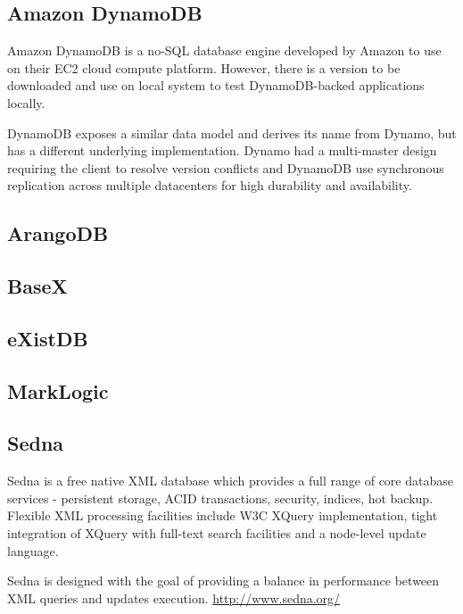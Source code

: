 \subsection{Amazon DynamoDB}
\label{sec:DynamoDB}


Amazon DynamoDB is a no-SQL database engine developed by Amazon to use on their
EC2 cloud compute platform. However, there is a version to be downloaded and use
on local system to test DynamoDB-backed applications locally.


DynamoDB exposes a similar data model and derives its name from Dynamo, but has
a different underlying implementation. Dynamo had a multi-master design
requiring the client to resolve version conflicts and DynamoDB use synchronous
replication across multiple datacenters for high durability and
availability.

\subsection{ArangoDB}
\label{sec:ArangoDB}


\subsection{BaseX}
\label{sec:BaseX}

\subsection{eXistDB}
\label{sec:eXistDB}

\subsection{MarkLogic}
\label{sec:MarkLogic}

\subsection{Sedna}
\label{sec:Sedna}

Sedna is a free native XML database which provides a full range of core database
services - persistent storage, ACID transactions, security, indices, hot backup.
Flexible XML processing facilities include W3C XQuery implementation, tight
integration of XQuery with full-text search facilities and a node-level update
language.

Sedna is designed with the goal of providing a balance in performance between
XML queries and updates execution.
\url{http://www.sedna.org/}

